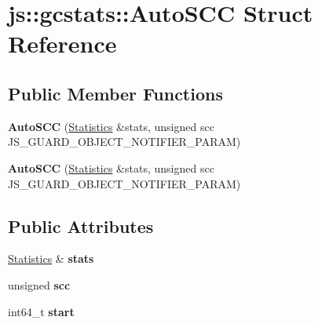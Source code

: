 \hypertarget{structjs_1_1gcstats_1_1_auto_s_c_c}{\section{js\-:\-:gcstats\-:\-:Auto\-S\-C\-C Struct Reference}
\label{structjs_1_1gcstats_1_1_auto_s_c_c}
}
\subsection*{Public Member Functions}
\begin{DoxyCompactItemize}
\item 
\hypertarget{structjs_1_1gcstats_1_1_auto_s_c_c_a060760f353ec4376a61b9eddbaef4905}{{\bfseries Auto\-S\-C\-C} (\hyperlink{structjs_1_1gcstats_1_1_statistics}{Statistics} \&stats, unsigned scc J\-S\-\_\-\-G\-U\-A\-R\-D\-\_\-\-O\-B\-J\-E\-C\-T\-\_\-\-N\-O\-T\-I\-F\-I\-E\-R\-\_\-\-P\-A\-R\-A\-M)}\label{structjs_1_1gcstats_1_1_auto_s_c_c_a060760f353ec4376a61b9eddbaef4905}

\item 
\hypertarget{structjs_1_1gcstats_1_1_auto_s_c_c_a060760f353ec4376a61b9eddbaef4905}{{\bfseries Auto\-S\-C\-C} (\hyperlink{structjs_1_1gcstats_1_1_statistics}{Statistics} \&stats, unsigned scc J\-S\-\_\-\-G\-U\-A\-R\-D\-\_\-\-O\-B\-J\-E\-C\-T\-\_\-\-N\-O\-T\-I\-F\-I\-E\-R\-\_\-\-P\-A\-R\-A\-M)}\label{structjs_1_1gcstats_1_1_auto_s_c_c_a060760f353ec4376a61b9eddbaef4905}

\end{DoxyCompactItemize}
\subsection*{Public Attributes}
\begin{DoxyCompactItemize}
\item 
\hypertarget{structjs_1_1gcstats_1_1_auto_s_c_c_a10081d059fefc0e37701bb2f06bbb641}{\hyperlink{structjs_1_1gcstats_1_1_statistics}{Statistics} \& {\bfseries stats}}\label{structjs_1_1gcstats_1_1_auto_s_c_c_a10081d059fefc0e37701bb2f06bbb641}

\item 
\hypertarget{structjs_1_1gcstats_1_1_auto_s_c_c_ab0151c0a66b335b5a6e32ef539785e44}{unsigned {\bfseries scc}}\label{structjs_1_1gcstats_1_1_auto_s_c_c_ab0151c0a66b335b5a6e32ef539785e44}

\item 
\hypertarget{structjs_1_1gcstats_1_1_auto_s_c_c_a7eb85ca27de23f3a1787277de59ebad5}{int64\-\_\-t {\bfseries start}}\label{structjs_1_1gcstats_1_1_auto_s_c_c_a7eb85ca27de23f3a1787277de59ebad5}

\end{DoxyCompactItemize}



